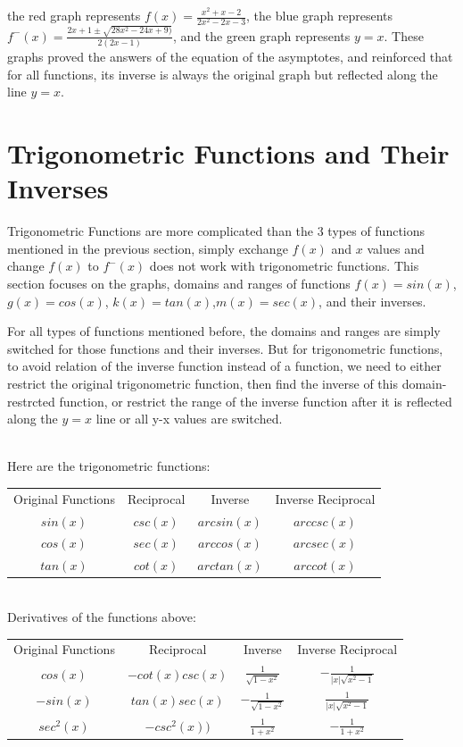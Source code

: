 \documentclass[12pt, titlepage]{article}
\begin{document}
    the red graph represents $f(x)=\frac{x^2+x-2}{2x^2-2x-3}$, the blue graph represents $f^-(x)=\frac{2x+1\pm\sqrt{28x^2-24x+9)}}{2(2x-1)}$, and the green graph represents $y=x$. These graphs proved the answers of the equation of the asymptotes, and reinforced that for all functions, its inverse is always the original graph but reflected along the line $y=x$.

\newpage
\section{Trigonometric Functions and Their Inverses}
    Trigonometric Functions are more complicated than the 3 types of functions mentioned in the previous section, simply exchange $f(x)$ and $x$ values and change $f(x)$ to $f^-(x)$ does not work with trigonometric functions. This section focuses on the graphs, domains and ranges of functions $f(x)=sin(x)$, $g(x)=cos(x)$, $k(x)=tan(x)$,$m(x)=sec(x)$, and their inverses.

    For all types of functions mentioned before, the domains and ranges are simply switched for those functions and their inverses. But for trigonometric functions, to avoid relation of the inverse function instead of a function, we need to either restrict the original trigonometric function, then find the inverse of this domain-restrcted function, or restrict the range of the inverse function after it is reflected along the $y=x$ line or all y-x values are switched. 

    \\
    Here are the trigonometric functions:
    \begin{center}
        \begin{tabular}{c|c|c|c}
           Original Functions & Reciprocal  & Inverse  & Inverse Reciprocal  \\
           $sin(x)$  & $csc(x)$ & $arcsin(x)$ & $arccsc(x)$\\
            $cos(x)$ & $sec(x)$ & $arccos(x)$ & $arcsec(x)$\\
            $tan(x)$ & $cot(x)$ & $arctan(x)$ & $arccot(x)$
    \end{tabular}
    \end{center}
    
    \\ 
    Derivatives of the functions above:
    \begin{center}
        \begin{tabular}{c|c|c|c}
           Original Functions & Reciprocal  & Inverse  & Inverse Reciprocal  \\
           $cos(x)$  & $-cot(x)csc(x)$ & $\frac{1}{\sqrt{1-x^2}}$ & $-\frac{1}{|x|\sqrt{x^2-1}}$\\
            $-sin(x)$ & $tan(x)sec(x)$ & $-\frac{1}{\sqrt{1-x^2}}$ & $\frac{1}{|x|\sqrt{x^2-1}}$\\
            $sec^2(x)$ & $-csc^2(x))$ & $\frac{1}{1+x^2}$ & $-\frac{1}{1+x^2}$
    \end{tabular}
    \end{center}
\end{document}
